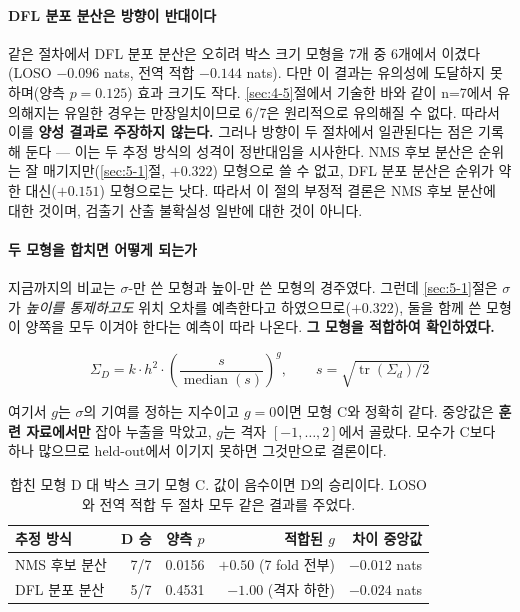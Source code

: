 \documentclass[12pt,a4paper,oneside]{report}
\begin{document}
\paragraph{DFL 분포 분산은 방향이 반대이다} 같은 절차에서 DFL 분포 분산은 오히려 박스 크기 모형을 7개 중 6개에서 이겼다(LOSO $-0.096$ nats, 전역 적합 $-0.144$ nats). 다만 이 결과는 유의성에 도달하지 못하며(양측 $p = 0.125$) 효과 크기도 작다. \ref{sec:4-5}절에서 기술한 바와 같이 n=7에서 유의해지는 유일한 경우는 만장일치이므로 6/7은 원리적으로 유의해질 수 없다. 따라서 이를 \textbf{양성 결과로 주장하지 않는다.} 그러나 방향이 두 절차에서 일관된다는 점은 기록해 둔다 --- 이는 두 추정 방식의 성격이 정반대임을 시사한다. NMS 후보 분산은 순위는 잘 매기지만(\ref{sec:5-1}절, $+0.322$) 모형으로 쓸 수 없고, DFL 분포 분산은 순위가 약한 대신($+0.151$) 모형으로는 낫다. 따라서 이 절의 부정적 결론은 NMS 후보 분산에 대한 것이며, 검출기 산출 불확실성 일반에 대한 것이 아니다.

\paragraph{두 모형을 합치면 어떻게 되는가} 지금까지의 비교는 $\sigma$-만 쓴 모형과 높이-만 쓴 모형의 경주였다. 그런데 \ref{sec:5-1}절은 $\sigma$가 \textit{높이를 통제하고도} 위치 오차를 예측한다고 하였으므로($+0.322$), 둘을 함께 쓴 모형이 양쪽을 모두 이겨야 한다는 예측이 따라 나온다. \textbf{그 모형을 적합하여 확인하였다.}

\begin{equation}
\Sigma_D = k \cdot h^2 \cdot \left(\frac{s}{\operatorname{median}(s)}\right)^{g},\qquad s = \sqrt{\operatorname{tr}(\Sigma_d)/2}
\end{equation}

여기서 $g$는 $\sigma$의 기여를 정하는 지수이고 $g = 0$이면 모형 C와 정확히 같다. 중앙값은 \textbf{훈련 자료에서만} 잡아 누출을 막았고, $g$는 격자 $[-1, \ldots, 2]$에서 골랐다. 모수가 C보다 하나 많으므로 held-out에서 이기지 못하면 그것만으로 결론이다.

\begin{table}[htbp]
\centering
\small
\caption{합친 모형 D 대 박스 크기 모형 C. 값이 음수이면 D의 승리이다. LOSO와 전역 적합 두 절차 모두 같은 결과를 주었다.}
\label{tab:combined}
\begin{tabular}{lrrrr}
\toprule
\textbf{추정 방식} & D 승 & 양측 $p$ & 적합된 $g$ & 차이 중앙값 \\
\midrule
NMS 후보 분산 & 7/7 & 0.0156 & $+0.50$ (7 fold 전부) & $-0.012$ nats \\
DFL 분포 분산 & 5/7 & 0.4531 & $-1.00$ (격자 하한) & $-0.024$ nats \\
\bottomrule
\end{tabular}
\end{table}
\end{document}
